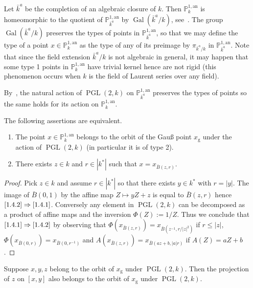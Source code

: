 \documentclass[10pt]{amsart}
\theoremstyle{definition}\newtheorem{defi}[theo]{Definition}\newtheorem{rema}[theo]{Remark}\newtheorem{exam}[theo]{Example}\newtheorem{exem}[theo]{Example}\newtheorem{nota}[theo]{Notation}
\DeclareMathOperator{\Gal}{Gal}
\DeclareMathOperator{\PGL}{PGL}
\newcommand{\an}{\mathrm{an}}
\newcommand{\abs}[1]{\left\vert#1\right\vert}
\newcommand{\PP}{\mathbb{P}}
\begin{document}
Let $\bar{k}^a$ be the completion of an algebraic closure of $k$. Then $\PP^{1,\an}_{k}$ is homeomorphic to the quotient of $\PP^{1,\an}_{\bar{k}^a}$ by $\Gal(\bar{k}^a/k)$, see~\cite[Cor.~1.3.6]{berko}. The group $\Gal(\bar{k}^a/k)$ preserves the types of points in $\PP^{1,\an}_{\bar{k}^a}$, so that we may define the type of a point $x \in \PP^{1,\an}_k$ as the type of any of its preimage by $\pi_{\bar{k}^a/k}$ in $\PP^{1,\an}_{\bar{k}^a}$. Note that since the field extension $\bar{k}^a/k$ is not algebraic in general, it may happen that some type 1 points in $\PP^{1,\an}_k$ have trivial kernel hence are not rigid (this phenomenon occurs when $k$ is the field of Laurent series over any field).

By~\cite[Prop.~2.15]{baker-rumely}, the natural action of $\PGL(2, k)$ on $\PP^{1,\an}_{\bar{k}^a}$ preserves the types of points so the same holds for its action on $\PP^{1,\an}_k$.

\begin{prop}\label{prop:orbit gauss}
The following assertions are equivalent.
\begin{enumerate}
\item \label{1.4.1} The point $x\in \PP^{1,\an}_k$ belongs to the orbit of the Gau{\ss} point $x_{\mathrm{g}}$ under the action of $\PGL(2,k)$ (in particular it is of type 2).
\item \label{1.4.2} There exists $z\in k$ and $r\in |k^*|$ such that $x= x_{\bar{B}(z,r)}$.
\end{enumerate}
\end{prop}

\begin{proof}
Pick $z\in k$ and assume $r\in \abs{k^*}$ so that there exists $y\in k^*$ with $r= |y|$. The image of $\bar{B}(0,1)$ by the affine map $Z \mapsto yZ + z$ is equal to $\bar{B}(z,r)$ hence $\eqref{1.4.2}\Rightarrow\eqref{1.4.1}$. Conversely any element in $\PGL(2,k)$ can be decomposed as a product of affine maps and the inversion $\Phi(Z) := 1/Z$. Thus we conclude that $\eqref{1.4.1}\Rightarrow\eqref{1.4.2}$ by observing that $\Phi(x_{\bar{B}(z,r)})= x_{\bar{B}(z^{-1},r/|z|^2)}$ if $r \le |z|$, $\Phi(x_{\bar{B}(0,r)})= x_{\bar{B}(0,r^{-1})}$ and $A(x_{\bar{B}(z,r)}) = x_{\bar{B}(az+b, |a|r)}$ if $A(Z) = aZ +b$.
\end{proof}

\begin{prop}\label{prop:projection}
Suppose $x,y, z$ belong to the orbit of $x_{\mathrm{g}}$ under $\PGL(2,k)$. Then the projection of $z$ on $[x,y]$ also belongs to the orbit of $x_{\mathrm{g}}$ under $\PGL(2,k)$.
\end{prop}
\end{document}

